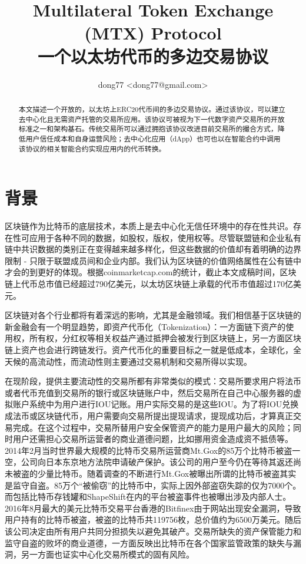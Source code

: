 \documentclass[UTF8,nofonts]{ctexart}
\title{Multilateral Token Exchange (MTX) Protocol\\一个以太坊代币的多边交易协议}
\author{ 
    dong77 <dong77@gmail.com>
}
\begin{document}
\maketitle

\begin{abstract}
本文描述一个开放的，以太坊上ERC20代币间的多边交易协议。通过该协议，可以建立去中心化且无需资产托管的交易所应用。该协议可被视为下一代数字资产交易所的开放标准之一和架构基石。传统交易所可以通过拥抱该协议改进目前交易所的撮合方式，降低用户信任成本和自身运营风险；去中心化应用（dApp）也可也以在智能合约中调用该协议的相关智能合约实现应用内的代币转换。

\end{abstract}

\section{背景\label{sec:background}}

区块链作为比特币的底层技术，本质上是去中心化无信任环境中的存在性共识。存在性可应用于各种不同的数据，如股权，版权，使用权等。尽管联盟链和企业私有链中共识数据的类别正在变得越来越多样化，但这些数据的价值却有着明确的边界限制 - 只限于联盟成员间和企业内部。我们认为区块链的价值网络属性在公有链中才会的到更好的体现。根据coinmarketcap.com的统计，截止本文成稿时间，区块链上代币总市值已经超过790亿美元，以太坊区块链上承载的代币市值超过170亿美元。

区块链对各个行业都将有着深远的影响，尤其是金融领域。我们相信基于区块链的新金融会有一个明显趋势，即资产代币化（Tokenization）：一方面链下资产的使用权，所有权，分红权等相关权益产通过抵押会被发行到区块链上，另一方面区块链上资产也会进行跨链发行。资产代币化的重要目标之一就是低成本，全球化，全天候的高流动性，而流动性则主要通过交易机制和交易所得以实现。

在现阶段，提供主要流动性的交易所都有非常类似的模式：交易所要求用户将法币或者代币充值到交易所的银行或区块链账户中，然后交易所在自己中心服务器的虚拟账户系统中为用户进行IOU记账。用户实际交易的是这些IOU。为了将IOU兑换成法币或区块链代币，用户需要向交易所提出提现请求，提现成功后，才算真正交易完成。在这个过程中，交易所替用户安全保管资产的能力是用户最大的风险；同时用户还需担心交易所运营者的商业道德问题，比如挪用资金造成资不抵债等。2014年2月当时世界最大规模的比特币交易所运营商Mt.Gox的85万个比特币被盗一空，公司向日本东京地方法院申请破产保护。该公司的用户至今仍在等待其返还尚未被盗的少量比特币。随着调查的不断进行Mt.Gox被曝出所谓的比特币被盗其实是监守自盗。85万个“被偷窃”的比特币中，实际上因外部盗窃失踪的仅为7000个。而包括比特币存钱罐和ShapeShift在内的平台被盗事件也被曝出涉及内部人士。2016年8月最大的美元比特币交易平台香港的Bitfinex由于网站出现安全漏洞，导致用户持有的比特币被盗，被盗的比特币共119756枚，总价值约为6500万美元。随后该公司决定由所有用户共同分担损失以避免其破产。交易所缺失的资产保管能力和监守自盗的败坏的商业道德，一方面反映出比特币在各个国家监管政策的缺失与漏洞，另一方面也证实中心化交易所模式的固有风险。
\end{document}
